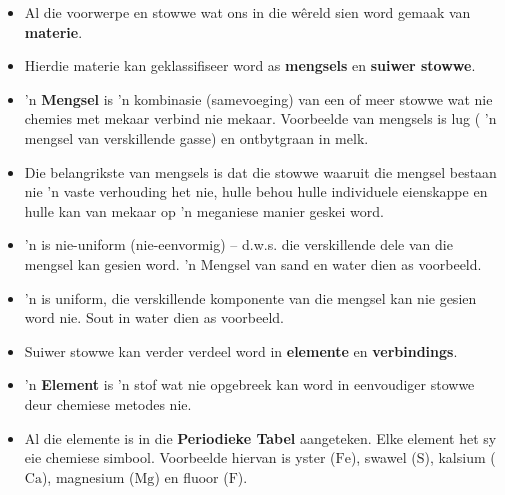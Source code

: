 



\nopagebreak
\begin{itemize}[noitemsep]
     \item Al die voorwerpe en stowwe wat ons in die wêreld sien word gemaak van \textbf{materie}.
     \item Hierdie materie kan geklassifiseer word as \textbf{mengsels} en \textbf{suiwer stowwe}.
     \item 'n \textbf{Mengsel} is 'n kombinasie (samevoeging) van een of meer stowwe wat nie chemies met mekaar verbind nie mekaar. Voorbeelde van mengsels is lug ( 'n mengsel van verskillende gasse) en ontbytgraan in melk.
     \item Die belangrikste  van mengsels is dat die stowwe waaruit die mengsel bestaan nie 'n vaste verhouding het nie, hulle behou hulle individuele eienskappe en hulle kan van mekaar op 'n meganiese manier geskei word.
     \item 'n  is nie-uniform (nie-eenvormig) – d.w.s. die verskillende dele van die mengsel kan gesien word. 'n Mengsel van sand en water dien as voorbeeld.
     \item 'n  is uniform, die verskillende komponente van die mengsel kan nie gesien word nie. Sout in water dien as voorbeeld.
     \item Suiwer stowwe kan verder verdeel word in \textbf{elemente} en \textbf{verbindings}.
     \item 'n \textbf{Element} is 'n stof wat nie opgebreek kan word in eenvoudiger stowwe deur chemiese metodes nie.
     \item Al die elemente is in die \textbf{Periodieke Tabel} aangeteken. Elke element het sy eie chemiese simbool. Voorbeelde hiervan is yster ($\text{Fe}$), swawel ($\text{S}$), kalsium ($\text{Ca}$), magnesium ($\text{Mg}$) en fluoor ($\text{F}$).

\end{itemize}
